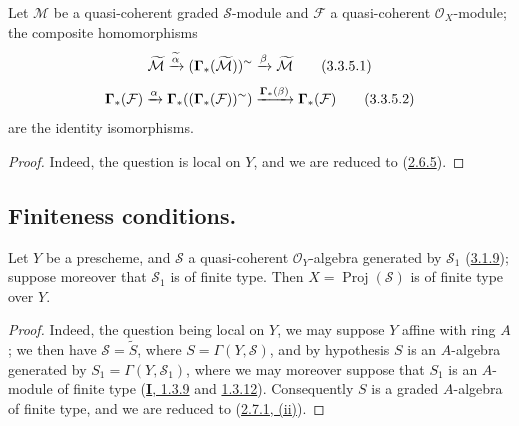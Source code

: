 \begin{proposition}[3.3.5]
\label{II.3.3.5}
Let $\mathcal{M}$ be a quasi-coherent graded $\mathcal{S}$-module and
$\mathcal{F}$ a quasi-coherent $\mathcal{O}_X$-module; the composite
homomorphisms
\[
\label{II.3.3.5.1}
  \widetilde{\mathcal{M}}
  \xrightarrow{\widetilde{\alpha}}
  (\boldsymbol{\Gamma}_*(\widetilde{\mathcal{M}}))^{\sim}
  \xrightarrow{\beta}\widetilde{\mathcal{M}}
\tag{3.3.5.1}
\]
\[
\label{II.3.3.5.2}
  \boldsymbol{\Gamma}_*(\mathcal{F})\xrightarrow{\alpha}
  \boldsymbol{\Gamma}_*((\boldsymbol{\Gamma}_*(\mathcal{F}))^{\sim})
  \xrightarrow{\boldsymbol{\Gamma}_*(\beta)}\boldsymbol{\Gamma}_*(\mathcal{F})
\tag{3.3.5.2}
\]
are the identity isomorphisms.
\end{proposition}

\begin{proof}
Indeed, the question is local on $Y$, and we are reduced to
(\hyperref[II.2.6.5]{2.6.5}).
\end{proof}


\subsection{Finiteness conditions.}
\label{subsection:II.3.4}


\begin{proposition}[3.4.1]
\label{II.3.4.1}
Let $Y$ be a prescheme, and $\mathcal{S}$ a quasi-coherent $\mathcal{O}_Y$-algebra
generated by $\mathcal{S}_1$
\textup{(\hyperref[II.3.1.9]{3.1.9})}; suppose moreover that $\mathcal{S}_1$ is of
finite type. Then $X=\operatorname{Proj}(\mathcal{S})$ is of finite type over
$Y$.
\end{proposition}

\begin{proof}
Indeed, the question being local on $Y$, we may suppose $Y$ affine
with ring $A$; we then have $\mathcal{S}=\widetilde{S}$, where
$S=\Gamma(Y,\mathcal{S})$, and by hypothesis $S$ is an $A$-algebra generated
by $S_1=\Gamma(Y,\mathcal{S}_1)$, where we may moreover suppose that $S_1$ is
an $A$-module of finite type
(\hyperref[I.1.3.9]{\textbf{I}, 1.3.9} and
\hyperref[I.1.3.12]{1.3.12}). Consequently $S$ is a graded $A$-algebra
of finite type, and we are reduced to
(\hyperref[II.2.7.1]{2.7.1, (ii)}).
\end{proof}

